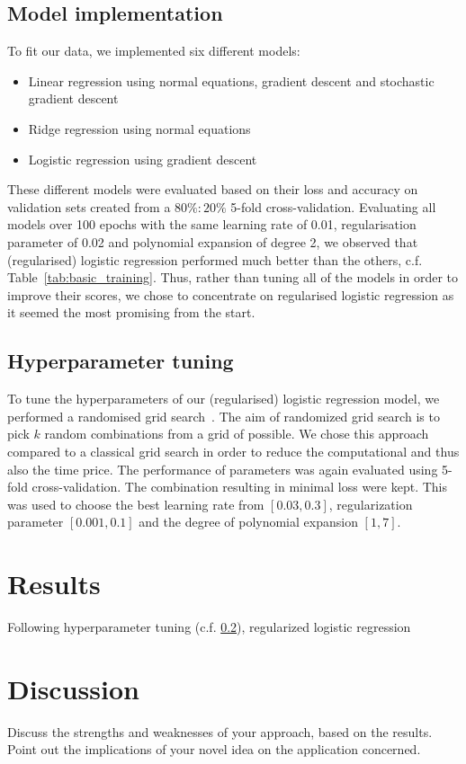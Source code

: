 \documentclass[10pt,conference,compsocconf]{IEEEtran}
\begin{document}
  \subsection{
  Model implementation
  }
  To fit our data, we implemented six different models: 
    \begin{itemize}
        \item Linear regression using normal equations, gradient descent and stochastic gradient descent 
        \item Ridge regression using normal equations
        \item Logistic regression using gradient descent 
    \end{itemize}
    These different models were evaluated based on their loss and accuracy on validation sets created from a $80\%:20\%$ 5-fold cross-validation. Evaluating all models over 100 epochs with the same learning rate of 0.01, regularisation parameter of 0.02 and polynomial expansion of degree 2, we observed that (regularised) logistic regression performed much better than the others, c.f. Table~\ref{tab:basic_training}. Thus, rather than tuning all of the models in order to improve their scores, we chose to concentrate on regularised logistic regression as it seemed the most promising from the start. 
    
    \subsection{Hyperparameter tuning}\label{subsubsec: parameter_tuning}
    To tune the hyperparameters of our (regularised) logistic regression model, we performed a randomised grid search~\cite{jonasbenner2019}. The aim of randomized grid search is to pick $k$ random combinations from a grid of possible. We chose this approach compared to a classical grid search in order to reduce the computational and thus also the time price. The performance of parameters was again evaluated using 5-fold cross-validation. The combination resulting in minimal loss were kept. This was used to choose the best learning rate from  $[0.03,0.3]$, regularization parameter $[0.001,0.1]$ and the degree of polynomial expansion $[1,7]$.
    
\section{Results}\label{sec: results}
Following hyperparameter tuning (c.f. \ref{subsubsec: parameter_tuning}), regularized logistic regression 
\section{Discussion}\label{sec: discussion}
Discuss the strengths and weaknesses of your
  approach, based on the results. Point out the implications of your
  novel idea on the application concerned.
\end{document}
